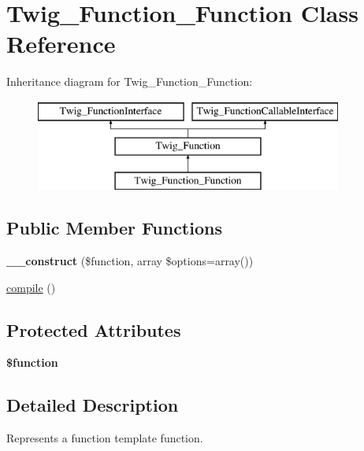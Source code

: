 \hypertarget{classTwig__Function__Function}{}\section{Twig\+\_\+\+Function\+\_\+\+Function Class Reference}
\label{classTwig__Function__Function}
Inheritance diagram for Twig\+\_\+\+Function\+\_\+\+Function\+:\begin{figure}[H]
\begin{center}
\leavevmode
\includegraphics[height=3.000000cm]{classTwig__Function__Function}
\end{center}
\end{figure}
\subsection*{Public Member Functions}
\begin{DoxyCompactItemize}
\item 
{\bfseries \+\_\+\+\_\+construct} (\$function, array \$options=array())\hypertarget{classTwig__Function__Function_a21d46961bff142735b058e36127b1355}{}\label{classTwig__Function__Function_a21d46961bff142735b058e36127b1355}

\item 
\hyperlink{classTwig__Function__Function_a5fd000b5b9af374c0e3fbaed4f866fad}{compile} ()
\end{DoxyCompactItemize}
\subsection*{Protected Attributes}
\begin{DoxyCompactItemize}
\item 
{\bfseries \$function}\hypertarget{classTwig__Function__Function_a22c257b1a2513a6f5ef56520d5f4cd27}{}\label{classTwig__Function__Function_a22c257b1a2513a6f5ef56520d5f4cd27}

\end{DoxyCompactItemize}


\subsection{Detailed Description}
Represents a function template function.

